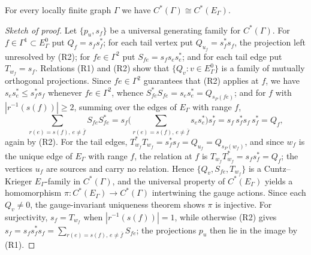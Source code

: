 \documentclass[10pt,a4paper]{amsart}
\begin{document}
\begin{theorem}\label{thm:general-realisation}
For every locally finite graph $\Gamma$ we have $C^*(\Gamma)\cong C^*(E_\Gamma)$.
\end{theorem}

\begin{proof}[Sketch of proof]
Let $\{p_u,s_f\}$ be a universal generating family for $C^*(\Gamma)$. For $f\in\Gamma^1\subset
E_\Gamma^0$ put $Q_f=s_fs_f^*$; for each tail vertex put $Q_{u_f}=s_f^*s_f$, the projection left
unresolved by (R2); for $fe\in\Gamma^2$ put $S_{fe}=s_fs_es_e^*$; and for each tail edge put
$T_{w_f}=s_f$. Relations (R1) and (R2) show that $\{Q_v : v\in E_\Gamma^0\}$ is a family of
mutually orthogonal projections. Since $fe\in\Gamma^2$ guarantees that (R2) applies at $f$, we have
$s_es_e^*\le s_f^*s_f$ whenever $fe\in\Gamma^2$, whence
$S_{fe}^*S_{fe}=s_es_e^*=Q_{s_P(fe)}$; and for $f$ with $|r^{-1}(s(f))|\ge 2$, summing over the
edges of $E_\Gamma$ with range $f$,
\[
\sum_{r(e)=s(f),\,e\neq\bar f}S_{fe}S_{fe}^{*}
= s_f\Big(\sum_{r(e)=s(f),\,e\neq\bar f}s_es_e^{*}\Big)s_f^{*}
= s_f\,s_f^{*}s_f\,s_f^{*}=Q_f,
\]
again by (R2). For the tail edges,
$T_{w_f}^*T_{w_f}=s_f^*s_f=Q_{u_f}=Q_{s_P(w_f)}$, and since $w_f$ is the unique edge of $E_\Gamma$
with range $f$, the relation at $f$ is $T_{w_f}T_{w_f}^*=s_fs_f^*=Q_f$; the vertices $u_f$ are
sources and carry no relation. Hence $\{Q_v,S_{fe},T_{w_f}\}$ is a Cuntz--Krieger
$E_\Gamma$-family in $C^*(\Gamma)$, and the universal property of $C^*(E_\Gamma)$ yields a
homomorphism $\pi\colon C^*(E_\Gamma)\to C^*(\Gamma)$ intertwining the gauge actions. Since each
$Q_v\neq 0$, the gauge-invariant uniqueness theorem shows $\pi$ is injective. For surjectivity,
$s_f=T_{w_f}$ when $|r^{-1}(s(f))|=1$, while otherwise (R2) gives
$s_f=s_fs_f^*s_f=\sum_{r(e)=s(f),\,e\neq\bar f}S_{fe}$; the projections $p_u$ then lie in the image
by (R1).
\end{proof}
\end{document}

